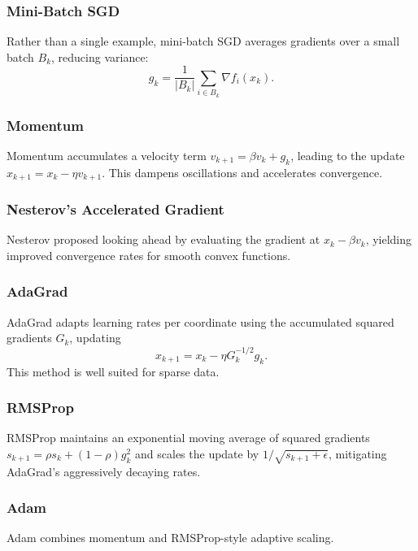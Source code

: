 \subsubsection{Mini-Batch SGD}
Rather than a single example, mini-batch SGD averages gradients over a small batch $B_k$, reducing variance:
\begin{equation}
g_k = \frac{1}{|B_k|}\sum_{i\in B_k} \nabla f_i(x_k).
\end{equation}

\subsubsection{Momentum \cite{polyak1964}}
Momentum accumulates a velocity term $v_{k+1}=\beta v_k + g_k$, leading to the update $x_{k+1}=x_k-\eta v_{k+1}$. This dampens oscillations and accelerates convergence.

\subsubsection{Nesterov's Accelerated Gradient \cite{nesterov1983}}
Nesterov proposed looking ahead by evaluating the gradient at $x_k-\beta v_k$, yielding improved convergence rates for smooth convex functions.

\subsubsection{AdaGrad \cite{duchi2011}}
AdaGrad adapts learning rates per coordinate using the accumulated squared gradients $G_k$, updating
\begin{equation}
x_{k+1}=x_k-\eta G_k^{-1/2} g_k.
\end{equation}
This method is well suited for sparse data.

\subsubsection{RMSProp \cite{tieleman2012}}
RMSProp maintains an exponential moving average of squared gradients $s_{k+1}=\rho s_k+(1-\rho)g_k^2$ and scales the update by $1/\sqrt{s_{k+1}+\epsilon}$, mitigating AdaGrad's aggressively decaying rates.

\subsubsection{Adam \cite{kingma2015}}
Adam combines momentum and RMSProp-style adaptive scaling.

